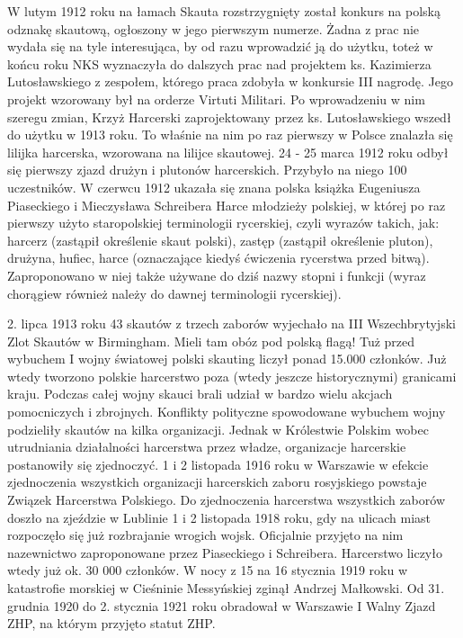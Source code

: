 W lutym 1912 roku na łamach Skauta rozstrzygnięty został konkurs na polską odznakę skautową, ogłoszony w jego pierwszym numerze. Żadna z prac nie wydała się na tyle interesująca, by od razu wprowadzić ją do użytku, toteż w końcu roku NKS wyznaczyła do dalszych prac nad projektem ks. Kazimierza Lutosławskiego z zespołem, którego praca zdobyła w konkursie III nagrodę. Jego projekt wzorowany był na orderze Virtuti Militari. Po wprowadzeniu w nim szeregu zmian, Krzyż Harcerski zaprojektowany przez ks. Lutosławskiego wszedł do użytku w 1913 roku. To właśnie na nim po raz pierwszy w Polsce znalazła się lilijka harcerska, wzorowana na lilijce skautowej. 24 - 25 marca 1912 roku odbył się pierwszy zjazd drużyn i plutonów harcerskich. Przybyło na niego 100 uczestników. W czerwcu 1912 ukazała się znana polska książka Eugeniusza Piaseckiego i Mieczysława Schreibera Harce młodzieży polskiej, w której po raz pierwszy użyto staropolskiej terminologii rycerskiej, czyli wyrazów takich, jak: harcerz (zastąpił określenie skaut polski), zastęp (zastąpił określenie pluton), drużyna, hufiec, harce (oznaczające kiedyś ćwiczenia rycerstwa przed bitwą). Zaproponowano w niej także używane do dziś nazwy stopni i funkcji (wyraz chorągiew również należy do dawnej terminologii rycerskiej).

2. lipca 1913 roku 43 skautów z trzech zaborów wyjechało na III Wszechbrytyjski Zlot Skautów w Birmingham. Mieli tam obóz pod polską flagą! Tuż przed wybuchem I wojny światowej polski skauting liczył ponad 15.000 członków. Już wtedy tworzono polskie harcerstwo poza (wtedy jeszcze historycznymi) granicami kraju. Podczas całej wojny skauci brali udział w bardzo wielu akcjach pomocniczych i zbrojnych. Konflikty polityczne spowodowane wybuchem wojny podzieliły skautów na kilka organizacji. Jednak w Królestwie Polskim wobec utrudniania działalności harcerstwa przez władze, organizacje harcerskie postanowiły się zjednoczyć. 1 i 2 listopada 1916 roku w Warszawie w efekcie zjednoczenia wszystkich organizacji harcerskich zaboru rosyjskiego powstaje Związek Harcerstwa Polskiego. Do zjednoczenia harcerstwa wszystkich zaborów doszło na zjeździe w Lublinie 1 i 2 listopada 1918 roku, gdy na ulicach miast rozpoczęło się już rozbrajanie wrogich wojsk. Oficjalnie przyjęto na nim nazewnictwo zaproponowane przez Piaseckiego i Schreibera. Harcerstwo liczyło wtedy już ok. 30 000 członków. W nocy z 15 na 16 stycznia 1919 roku w katastrofie morskiej w Cieśninie Messyńskiej zginął Andrzej Małkowski. Od 31. grudnia 1920 do 2. stycznia 1921 roku obradował w Warszawie I Walny Zjazd ZHP, na którym przyjęto statut ZHP. 

